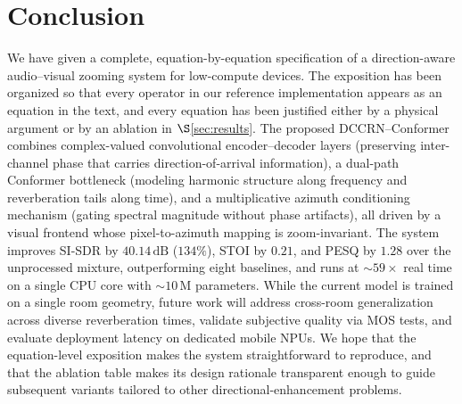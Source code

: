 \documentclass[journal,10pt]{IEEEtran}
\begin{document}
\section{Conclusion}
We have given a complete, equation-by-equation specification of a direction-aware audio--visual zooming system for low-compute devices. The exposition has been organized so that every operator in our reference implementation appears as an equation in the text, and every equation has been justified either by a physical argument or by an ablation in \(\S\)\ref{sec:results}. The proposed DCCRN--Conformer combines complex-valued convolutional encoder--decoder layers (preserving inter-channel phase that carries direction-of-arrival information), a dual-path Conformer bottleneck (modeling harmonic structure along frequency and reverberation tails along time), and a multiplicative azimuth conditioning mechanism (gating spectral magnitude without phase artifacts), all driven by a visual frontend whose pixel-to-azimuth mapping is zoom-invariant. The system improves SI-SDR by \(40.14\,\mathrm{dB}\) (\(134\%\)), STOI by \(0.21\), and PESQ by \(1.28\) over the unprocessed mixture, outperforming eight baselines, and runs at \(\sim\!59\!\times\) real time on a single CPU core with \(\sim\!10\,\mathrm{M}\) parameters. While the current model is trained on a single room geometry, future work will address cross-room generalization across diverse reverberation times, validate subjective quality via MOS tests, and evaluate deployment latency on dedicated mobile NPUs. We hope that the equation-level exposition makes the system straightforward to reproduce, and that the ablation table makes its design rationale transparent enough to guide subsequent variants tailored to other directional-enhancement problems.
\end{document}
